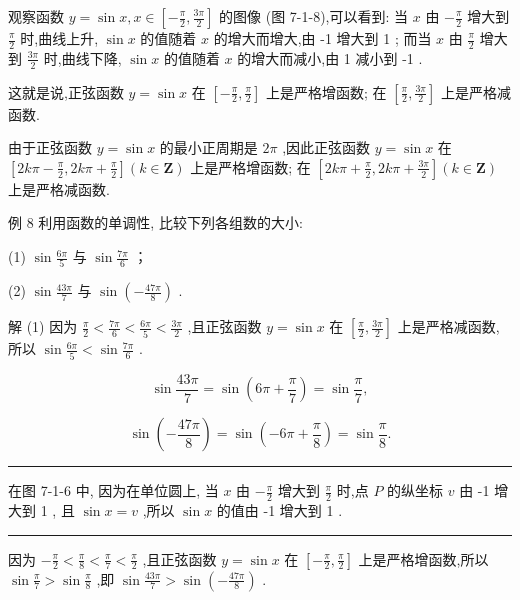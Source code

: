 \documentclass[10pt]{article}
\newcommand{\HRule}{\begin{center}\rule{0.9\linewidth}{0.2mm}\end{center}}
\begin{document}
观察函数 \(y = \sin x,x \in  \left\lbrack  {-\frac{\pi }{2},\frac{3\pi }{2}}\right\rbrack\) 的图像 (图 7-1-8),可以看到: 当 \(x\) 由 \(- \frac{\pi }{2}\) 增大到 \(\frac{\pi }{2}\) 时,曲线上升, \(\sin x\) 的值随着 \(x\) 的增大而增大,由 -1 增大到 1 ; 而当 \(x\) 由 \(\frac{\pi }{2}\) 增大到 \(\frac{3\pi }{2}\) 时,曲线下降, \(\sin x\) 的值随着 \(x\) 的增大而减小,由 1 减小到 -1 .

这就是说,正弦函数 \(y = \sin x\) 在 \(\left\lbrack  {-\frac{\pi }{2},\frac{\pi }{2}}\right\rbrack\) 上是严格增函数; 在 \(\left\lbrack  {\frac{\pi }{2},\frac{3\pi }{2}}\right\rbrack\) 上是严格减函数.

由于正弦函数 \(y = \sin x\) 的最小正周期是 \({2\pi }\) ,因此正弦函数 \(y = \sin x\) 在 \(\left\lbrack  {{2k\pi } - \frac{\pi }{2},{2k\pi } + \frac{\pi }{2}}\right\rbrack  \left( {k \in  \mathbf{Z}}\right)\) 上是严格增函数; 在 \(\left\lbrack  {{2k\pi } + \frac{\pi }{2},{2k\pi } + \frac{3\pi }{2}}\right\rbrack  \left( {k \in  \mathbf{Z}}\right)\) 上是严格减函数.

例 8 利用函数的单调性, 比较下列各组数的大小:

(1) \(\sin \frac{6\pi }{5}\) 与 \(\sin \frac{7\pi }{6}\) ；

(2) \(\sin \frac{43\pi }{7}\) 与 \(\sin \left( {-\frac{47\pi }{8}}\right)\) .

解 (1) 因为 \(\frac{\pi }{2} < \frac{7\pi }{6} < \frac{6\pi }{5} < \frac{3\pi }{2}\) ,且正弦函数 \(y = \sin x\) 在 \(\left\lbrack  {\frac{\pi }{2},\frac{3\pi }{2}}\right\rbrack\) 上是严格减函数,所以 \(\sin \frac{6\pi }{5} < \sin \frac{7\pi }{6}\) .

\[
\sin \frac{43\pi }{7} = \sin \left( {{6\pi } + \frac{\pi }{7}}\right)  = \sin \frac{\pi }{7},
\]

\[
\sin \left( {-\frac{47\pi }{8}}\right)  = \sin \left( {-{6\pi } + \frac{\pi }{8}}\right)  = \sin \frac{\pi }{8}.
\]

\HRule

在图 7-1-6 中, 因为在单位圆上, 当 \(x\) 由 \(- \frac{\pi }{2}\) 增大到 \(\frac{\pi }{2}\) 时,点 \(P\) 的纵坐标 \(v\) 由 -1 增大到 1 , 且 \(\sin x = v\) ,所以 \(\sin x\) 的值由 -1 增大到 1 .

\HRule

因为 \(- \frac{\pi }{2} < \frac{\pi }{8} < \frac{\pi }{7} < \frac{\pi }{2}\) ,且正弦函数 \(y = \sin x\) 在 \(\left\lbrack  {-\frac{\pi }{2},\frac{\pi }{2}}\right\rbrack\) 上是严格增函数,所以 \(\sin \frac{\pi }{7} > \sin \frac{\pi }{8}\) ,即 \(\sin \frac{43\pi }{7} > \sin \left( {-\frac{47\pi }{8}}\right)\) .
\end{document}
